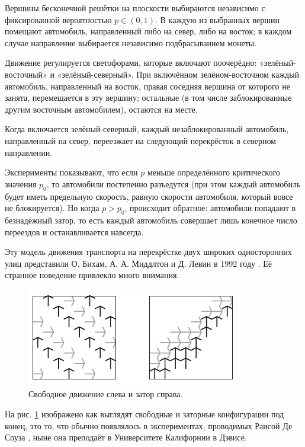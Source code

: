Вершины бесконечной решётки на плоскости выбираются независимо с
фиксированной вероятностью $p\in (0,1)$.
В каждую из выбранных вершин
помещают автомобиль, направленный либо на север, либо на восток;
в каждом случае направление выбирается независимо подбрасыванием монеты.

Движение регулируется светофорами, которые включают поочерёдно:
«зелёный-восточный» и «зелёный-северный».
При включённом
зелёном-восточном каждый автомобиль, направленный на восток, правая
соседняя вершина от которого не занята, перемещается в эту вершину;
остальные (в том числе заблокированные другим восточным автомобилем),
остаются на месте.

Когда включается зелёный-северный, каждый незаблокированный
автомобиль, направленный на север, переезжает на следующий перекрёсток в
северном направлении.

Эксперименты показывают, что если $p$ меньше определённого
критического значения $p_0$, то автомобили постепенно разъедутся
(при этом каждый автомобиль будет иметь предельную скорость,
равную скорости автомобиля, который вовсе не блокируется).
Но когда
$p> p_0$, происходит обратное: автомобили попадают в безнадёжный
затор, то есть каждый автомобиль совершает лишь конечное число переездов
и останавливается навсегда.

Эту модель движения транспорта на перекрёстке двух широких односторонних улиц представили О. Бихам, А. А. Миддлтон и Д. Левин в 1992 году \cite{6}.
Её странное поведение привлекло много внимания.

\begin{figure}[htb!]
\centering
\includegraphics[scale=1]{pics/gridlock}
\caption{Свободное движение слева и затор справа.}
\label{pic:gridlock}
\end{figure}

На рис. \ref{pic:gridlock} изображено как выглядят свободные и заторные конфигурации под конец, это то, что обычно появлялось в экспериментах, проводимых Раисой Де Соуза \cite{15}, ныне она преподаёт в Университете Калифорнии в Дэвисе.

